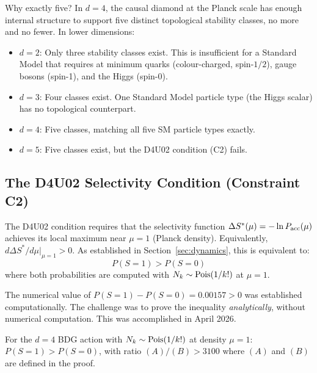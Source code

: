 \documentclass[12pt,a4paper]{article}
\begin{document}
Why exactly five?  In $d=4$, the causal diamond at the Planck scale has enough internal structure to support five distinct topological stability classes, no more and no fewer.  In lower dimensions:
\begin{itemize}
  \item $d=2$: Only three stability classes exist.  This is insufficient for a Standard Model that requires at minimum quarks (colour-charged, spin-$1/2$), gauge bosons (spin-1), and the Higgs (spin-0).
  \item $d=3$: Four classes exist.  One Standard Model particle type (the Higgs scalar) has no topological counterpart.
  \item $d=4$: Five classes, matching all five SM particle types exactly.
  \item $d=5$: Five classes exist, but the D4U02 condition (C2) fails.
\end{itemize}

\subsection{The D4U02 Selectivity Condition (Constraint C2)}\label{sec:d4u02}

The D4U02 condition requires that the selectivity function $\Delta S^*(\mu)=-\ln P_{\rm acc}(\mu)$ achieves its local maximum near $\mu=1$ (Planck density).  Equivalently, $d\Delta S^*/d\mu|_{\mu=1}>0$.  As established in Section~\ref{sec:dynamics}, this is equivalent to:
\begin{equation}
  P(S=1) > P(S=0)
  \label{eq:key_ineq2}
\end{equation}
where both probabilities are computed with $N_k\sim{\rm Pois}(1/k!)$ at $\mu=1$.

The numerical value of $P(S=1)-P(S=0)=0.00157>0$ was established computationally.  The challenge was to prove the inequality \emph{analytically}, without numerical computation.  This was accomplished in April 2026.

\begin{theorem}\label{thm:d4u02}
For the $d=4$ BDG action with $N_k\sim{\rm Pois}(1/k!)$ at density $\mu=1$: $P(S=1)>P(S=0)$, with ratio $(A)/(B)>3100$ where $(A)$ and $(B)$ are defined in the proof.
\end{theorem}
\end{document}
